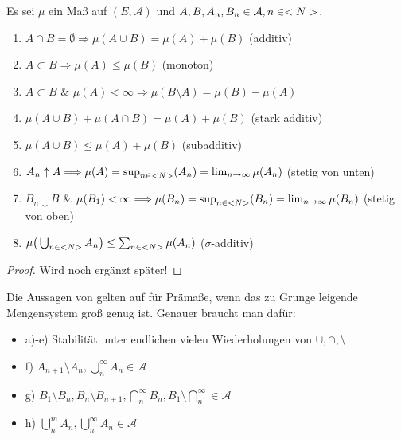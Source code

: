 \begin{proposition}
	Es sei $\mu$ ein Maß auf $(E,\mathcal{A})$ und $A,B,A_n, B_n \in \mathcal{A}, n \in <N>$.
	\begin{enumerate}
		\item $A\cap B = \emptyset \Longrightarrow \mu(A \cup B) = \mu(A) + \mu(B)$ (additiv)
		\item $A\subset B \Longrightarrow \mu(A) \leq \mu(B)$ (monoton)
		\item $A \subset B$ \& $\mu(A) < \infty \Longrightarrow \mu(B\setminus A) = \mu(B) - \mu(A)$
		\item $\mu(A \cup B) + \mu(A\cap B) = \mu(A) + \mu(B)$ (stark additiv)
		\item $\mu(A \cup B) \leq \mu(A) + \mu(B)$ (subadditiv)
		\item $A_n \uparrow A \Longrightarrow \mu(A)  = \sup_{n\in <N>} (A_n) = \lim_{n\to \infty} \mu(A_n)$ (stetig von unten)
		\item $B_n \downarrow B$ \& $\mu(B_1) < \infty \Longrightarrow \mu(B_n)  = \sup_{n\in <N>} (B_n) = \lim_{n\to \infty} \mu(B_n)$ (stetig von oben)
		\item $\mu\big(\bigcup_{n\in <N>} A_n\big) \leq \sum_{n\in <N>} \mu (A_n)$ ($\sigma$-additiv)
	\end{enumerate}
\end{proposition}

\begin{proof}
	Wird noch ergänzt später!
\end{proof}

\begin{remark}
	Die Aussagen von  gelten auf für Prämaße, wenn das zu Grunge leigende Mengensystem groß genug ist. Genauer braucht man dafür:
	\begin{itemize} %
		\item a)-e) Stabilität unter endlichen vielen Wiederholungen von $\cup,\cap,\setminus$
		\item f) $A_{n+1}\setminus A_n,\bigcup_{n}^{\infty} A_n \in \mathcal{A}$
		\item g) $B_1 \setminus B_n,B_n \setminus B_{n+1},\bigcap_{n}^{\infty} B_n,B_1\setminus \bigcap_{n}^{\infty} \in \mathcal{A}$
		\item h) $\bigcup_{n}^{m} A_n,\bigcup_{n}^{\infty} A_n \in \mathcal{A}$
	\end{itemize}
\end{remark}

